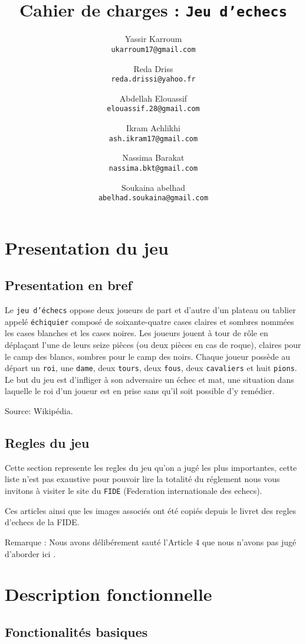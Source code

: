 \documentclass{article}
\author{
    Yassir Karroum\\
    \texttt{ukarroum17@gmail.com}
    \and
    Reda Driss\\
    \texttt{reda.drissi@yahoo.fr}
    \and
    Abdellah Elouassif\\
    \texttt{elouassif.28@gmail.com}
    \and
    Ikram Achlikhi\\
    \texttt{ash.ikram17@gmail.com}
    \and
    Nassima Barakat\\
    \texttt{nassima.bkt@gmail.com}
    \and
    Soukaina abelhad\\
    \texttt{abelhad.soukaina@gmail.com}
}
\title{Cahier de charges : \texttt{Jeu d'echecs}}
\begin{document}
\maketitle

\tableofcontents

\section{Presentation du jeu}

\subsection{Presentation en bref}

Le \texttt{jeu d’échecs} oppose deux joueurs de part et d’autre d’un plateau ou tablier appelé \texttt{échiquier} composé de soixante-quatre cases claires et sombres nommées les cases blanches et les cases noires. Les joueurs jouent à tour de rôle en déplaçant l'une de leurs seize pièces (ou deux pièces en cas de roque), claires pour le camp des blancs, sombres pour le camp des noirs. Chaque joueur possède au départ un \texttt{roi}, une \texttt{dame}, deux \texttt{tours}, deux \texttt{fous}, deux \texttt{cavaliers} et huit \texttt{pions}. Le but du jeu est d'infliger à son adversaire un échec et mat, une situation dans laquelle le roi d'un joueur est en prise sans qu'il soit possible d'y remédier.

Source: Wikipédia.
\subsection{Regles du jeu}

Cette section represente les regles du jeu qu'on a jugé les plus importantes, cette liste n'est pas exaustive pour pouvoir lire la totalité du réglement nous vous invitons à visiter le site du \texttt{FIDE} (Federation internationale des echecs).

Ces articles ainsi que les images associés ont été copiés depuis le livret des regles d'echecs de la FIDE.

Remarque : Nous avons délibérement sauté l'Article 4 que nous n'avons pas jugé d'aborder ici .




\section{Description fonctionnelle}

\subsection{Fonctionalités basiques}
\end{document}
